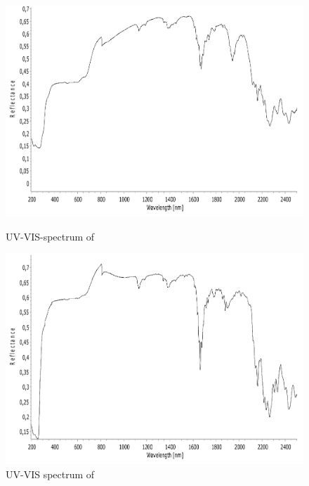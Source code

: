 \begin{figure}[!htpb]
\centering
\includegraphics[scale=0.43]{figures/ZnA4MOP-VIS.pdf}
\caption*{UV-VIS-spectrum of \ce{[Zn(N_3)_2(4-MeOpy)_2]}}
\label{fig:ZnA4MOP_vis}
\includegraphics[scale=0.43]{figures/CdD4MOP-VIS.pdf}
\caption*{UV-VIS spectrum of }
\label{fig:CdD4MOP_vis}
\end{figure}

